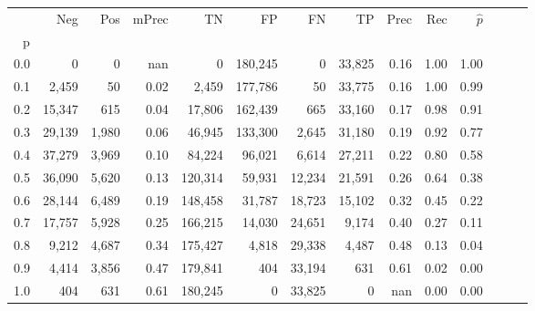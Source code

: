\begin{tabular}{rrrrrrrrrrrrrr}
\toprule
{} &     Neg &    Pos & mPrec &       TN &       FP &      FN &      TP &  Prec &   Rec & $\hat{p}$ \\
p   &         &        &       &          &          &         &         &       &       &           \\
\midrule
0.0 &       0 &      0 &   nan &        0 &  180,245 &       0 &  33,825 &  0.16 &  1.00 &      1.00 \\
0.1 &   2,459 &     50 &  0.02 &    2,459 &  177,786 &      50 &  33,775 &  0.16 &  1.00 &      0.99 \\
0.2 &  15,347 &    615 &  0.04 &   17,806 &  162,439 &     665 &  33,160 &  0.17 &  0.98 &      0.91 \\
0.3 &  29,139 &  1,980 &  0.06 &   46,945 &  133,300 &   2,645 &  31,180 &  0.19 &  0.92 &      0.77 \\
0.4 &  37,279 &  3,969 &  0.10 &   84,224 &   96,021 &   6,614 &  27,211 &  0.22 &  0.80 &      0.58 \\
0.5 &  36,090 &  5,620 &  0.13 &  120,314 &   59,931 &  12,234 &  21,591 &  0.26 &  0.64 &      0.38 \\
0.6 &  28,144 &  6,489 &  0.19 &  148,458 &   31,787 &  18,723 &  15,102 &  0.32 &  0.45 &      0.22 \\
0.7 &  17,757 &  5,928 &  0.25 &  166,215 &   14,030 &  24,651 &   9,174 &  0.40 &  0.27 &      0.11 \\
0.8 &   9,212 &  4,687 &  0.34 &  175,427 &    4,818 &  29,338 &   4,487 &  0.48 &  0.13 &      0.04 \\
0.9 &   4,414 &  3,856 &  0.47 &  179,841 &      404 &  33,194 &     631 &  0.61 &  0.02 &      0.00 \\
1.0 &     404 &    631 &  0.61 &  180,245 &        0 &  33,825 &       0 &   nan &  0.00 &      0.00 \\
\bottomrule
\end{tabular}
